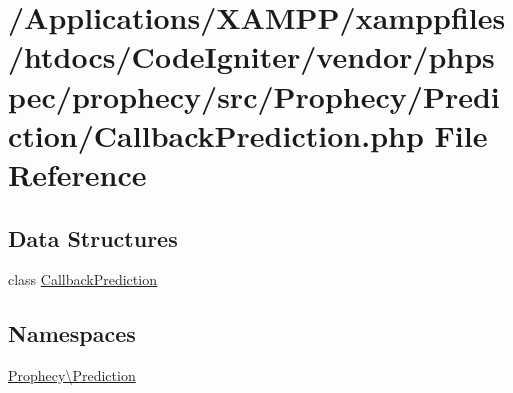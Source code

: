 \hypertarget{_callback_prediction_8php}{}\section{/\+Applications/\+X\+A\+M\+P\+P/xamppfiles/htdocs/\+Code\+Igniter/vendor/phpspec/prophecy/src/\+Prophecy/\+Prediction/\+Callback\+Prediction.php File Reference}
\label{_callback_prediction_8php}
\subsection*{Data Structures}
\begin{DoxyCompactItemize}
\item 
class \mbox{\hyperlink{class_prophecy_1_1_prediction_1_1_callback_prediction}{Callback\+Prediction}}
\end{DoxyCompactItemize}
\subsection*{Namespaces}
\begin{DoxyCompactItemize}
\item 
 \mbox{\hyperlink{namespace_prophecy_1_1_prediction}{Prophecy\textbackslash{}\+Prediction}}
\end{DoxyCompactItemize}
